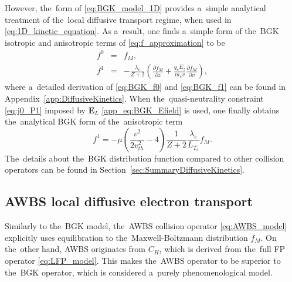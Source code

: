\documentclass[
 aps,
 jmp,
 amsmath,amssymb,
 twocolumn,
]{revtex4-1}
\newcommand{\pdv}[2]{\frac{\partial{#1}}{\partial{#2}}}
\newcommand{\vect}[1]{\boldsymbol{#1}}
\newcommand{\mfpe}{\lambda_e}
\newcommand{\Zbar}{Z}
\newcommand{\vmag}{v}
\newcommand{\vth}{v_{th}}
\newcommand{\E}{\vect{E}}
\newcommand{\Ez}{E_z}
\newcommand{\qe}{q_e}
\newcommand{\me}{m_e}
\newcommand{\fM}{f_M}
\newcommand{\ft}{f}
\begin{document}
However, the~form of \eqref{eq:BGK_model_1D} provides a~simple analytical 
treatment of the~local diffusive transport regime, when used in 
\eqref{eq:1D_kinetic_equation}. As a~result, one finds a~simple form of
the~BGK isotropic and anisotropic terms of \eqref{eq:f_approximation} to be
\begin{eqnarray}
  \ft^0 &=& \fM ,
  \label{eq:BGK_f0} \\
  \ft^1 &=& - \frac{\mfpe}{\Zbar + 2}
  \left( \pdv{\fM}{z} + \frac{\qe\Ez}{\me\vmag}\pdv{\fM}{\vmag} \right) ,
  \label{eq:BGK_f1}
\end{eqnarray}
where a~detailed derivation of \eqref{eq:BGK_f0} and \eqref{eq:BGK_f1} 
can be found in Appendix~\ref{app:DiffusiveKinetics}.
When the~quasi-neutrality constraint \eqref{eq:j0_P1} imposed by $\E_L$
\eqref{app_eq:BGK_Efield} is used, one finally obtains 
the~analytical BGK form of the~anisotropic term
\begin{equation}
  \ft^1 = - \mu 
  \left( \frac{\vmag^2}{2 \vth^2} - 4\right)\frac{1}{\Zbar + 2}
  \frac{\mfpe}{L_{T_e}}\fM
  . 
  \label{eq:BGK_approximation}
\end{equation}
The~details about the~BGK distribution function compared to other
collision operators can be found in Section~\ref{sec:SummaryDiffusiveKinetics}.

\subsection{AWBS local diffusive electron transport}
\label{sec:AWBSDiffusiveRegime}
Similarly to the~BGK model, the~AWBS collision operator \ref{eq:AWBS_model} 
explicitly uses equilibration to the~Maxwell-Boltzmann distribution $\fM$. 
On the~other hand, AWBS originates from $C_H$, which is derived from 
the~full FP operator \eqref{eq:LFP_model}. This makes the~AWBS operator 
to be superior to the~BGK operator, which is considered a~purely
phenomenological model.
\end{document}
